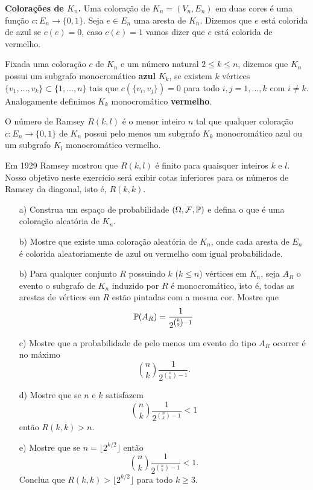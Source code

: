 \begin{enumerate}[leftmargin=*]
{\bf Colorações de $K_n$.}
Uma coloração de $K_n=(V_n,E_n)$ em duas cores 
é uma função $c:E_n\to \{0,1\}$.
Seja $e\in E_n$ uma aresta de $K_n$. 
Dizemos que $e$ está colorida de azul se $c(e)=0$, 
caso $c(e)=1$ vamos dizer que $e$ está colorida de vermelho.

Fixada uma coloração $c$ de $K_n$ e um 
número natural $2\leq k \leq n$, 
dizemos que $K_n$ possui um subgrafo monocromático
{\bf azul} $K_k$, se existem $k$ vértices 
$\{v_1,\ldots,v_k\}\subset \{1,\ldots,n\}$
tais que $c(\{v_i,v_j\})=0$ para todo $i,j=1,\ldots,k$
com $i\neq k$. Analogamente definimos $K_k$ 
monocromático {\bf vermelho}.


O número de Ramsey $R(k,l)$ é o menor inteiro
$n$ tal que qualquer coloração $c:E_n\to\{0,1\}$
de $K_n$ possui pelo menos um subgrafo $K_k$ monocromático azul 
ou um subgrafo $K_l$ monocromático vermelho.

Em 1929 Ramsey mostrou que $R(k,l)$ é finito para 
quaisquer inteiros $k$ e $l$. 
Nosso objetivo neste exercício será 
exibir cotas inferiores para 
os números de Ramsey da diagonal, isto é, 
$R(k,k)$.

	\begin{itemize}
		\item[a)] 
		Construa um espaço de probabilidade 
		$(\Omega,\F,\P)$ e defina o que é uma coloração aleatória 
		de $K_n$. 
		
		\item[b)] Mostre que existe uma coloração aleatória de $K_n$,
		onde cada aresta de $E_n$ é colorida aleatoriamente
		de azul ou vermelho com igual probabilidade.
		
		\item[b)] Para qualquer conjunto $R$ possuindo $k$ ($k\leq n$)
		vértices em $K_n$, 
		seja $A_R$ o evento o subgrafo de $K_n$ induzido 
		por $R$ é monocromático, isto é, todas as arestas
		de vértices em $R$ estão pintadas com a mesma cor. 
		Mostre que
			\[ 
				\P(A_R) = \frac{1}{2^{\binom{k}{2}-1  }}
			\]
		
		\item[c)] Mostre que a probabilidade de pelo menos um 
		evento do tipo $A_R$ ocorrer é no máximo 
			\[
				\binom{n}{k}\frac{1}{2^{\binom{n}{k}-1  }}.
			\]
			
		\item[d)] Mostre que se $n$ e $k$ satisfazem
			\[
				\binom{n}{k}\frac{1}{2^{\binom{n}{k}-1  }} < 1
			\]
		então $R(k,k)> n$.
		
		\item[e)] Mostre que se $n=\lfloor 2^{k/2} \rfloor$ então
			\[
				\binom{n}{k}\frac{1}{2^{\binom{n}{k}-1  }} < 1.
			\]
		Conclua que $R(k,k)> \lfloor 2^{k/2} \rfloor $ para todo 
		$k\geq 3$.		
		

\end{itemize}
\end{enumerate}
